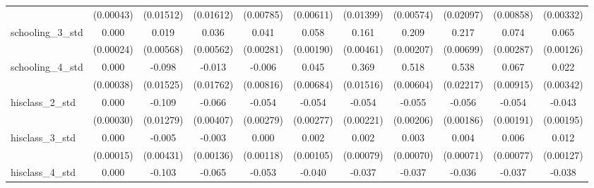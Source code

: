 {\begin{tabular}{l*{10}{c}}
                    &   (0.00043)         &   (0.01512)         &   (0.01612)         &   (0.00785)         &   (0.00611)         &   (0.01399)         &   (0.00574)         &   (0.02097)         &   (0.00858)         &   (0.00332)         \\
schooling\_3\_std     &       0.000         &       0.019\sym{***}&       0.036\sym{***}&       0.041\sym{***}&       0.058\sym{***}&       0.161\sym{***}&       0.209\sym{***}&       0.217\sym{***}&       0.074\sym{***}&       0.065\sym{***}\\
                    &   (0.00024)         &   (0.00568)         &   (0.00562)         &   (0.00281)         &   (0.00190)         &   (0.00461)         &   (0.00207)         &   (0.00699)         &   (0.00287)         &   (0.00126)         \\
schooling\_4\_std     &       0.000         &      -0.098\sym{***}&      -0.013         &      -0.006         &       0.045\sym{***}&       0.369\sym{***}&       0.518\sym{***}&       0.538\sym{***}&       0.067\sym{***}&       0.022\sym{***}\\
                    &   (0.00038)         &   (0.01525)         &   (0.01762)         &   (0.00816)         &   (0.00684)         &   (0.01516)         &   (0.00604)         &   (0.02217)         &   (0.00915)         &   (0.00342)         \\
hisclass\_2\_std      &       0.000         &      -0.109\sym{***}&      -0.066\sym{***}&      -0.054\sym{***}&      -0.054\sym{***}&      -0.054\sym{***}&      -0.055\sym{***}&      -0.056\sym{***}&      -0.054\sym{***}&      -0.043\sym{***}\\
                    &   (0.00030)         &   (0.01279)         &   (0.00407)         &   (0.00279)         &   (0.00277)         &   (0.00221)         &   (0.00206)         &   (0.00186)         &   (0.00191)         &   (0.00195)         \\
hisclass\_3\_std      &       0.000         &      -0.005         &      -0.003         &       0.000         &       0.002\sym{*}  &       0.002\sym{**} &       0.003\sym{***}&       0.004\sym{***}&       0.006\sym{***}&       0.012\sym{***}\\
                    &   (0.00015)         &   (0.00431)         &   (0.00136)         &   (0.00118)         &   (0.00105)         &   (0.00079)         &   (0.00070)         &   (0.00071)         &   (0.00077)         &   (0.00127)         \\
hisclass\_4\_std      &       0.000         &      -0.103\sym{***}&      -0.065\sym{***}&      -0.053\sym{***}&      -0.040\sym{***}&      -0.037\sym{***}&      -0.037\sym{***}&      -0.036\sym{***}&      -0.037\sym{***}&      -0.038\sym{***}\\

\end{tabular}}
